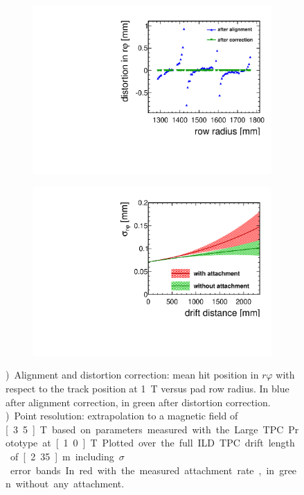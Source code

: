 \begin{figure}[htb!]
\begin{subfigure}[b]{0.48\textwidth}
\includegraphics[width=\textwidth]{Tracker/TPC_Bonn/plots/TPC-DG_distortionAlignmentPaper1Tdistcor.pdf}
\caption{}
\label{sfig:1Tdistort}
\end{subfigure}
\begin{subfigure}[b]{0.48\textwidth}
\includegraphics[width=\textwidth]{Tracker/TPC_Bonn/plots/TPC-DG_xyResolutionExtrapolated.pdf}
\caption{}
\label{sfig:resextrapol}
\end{subfigure}
\caption{\small \protect{})~Alignment and distortion correction: mean hit position in $r\varphi$ with respect to the track position at \SI{1}{\tesla} versus pad row radius. In blue after alignment correction, in green after distortion correction. \protect{})~Point resolution: extrapolation to a magnetic field of \unit[3.5]{T} based on parameters measured with the Large TPC Prototype at \unit[1.0]{T}. Plotted over the full ILD TPC drift length of \unit[2.35]{m} including \unit[1]{$\sigma$} error bands. In red with the measured attachment rate, in green without any attachment.}
\label{fig:align1Tdistort}
\end{figure}


